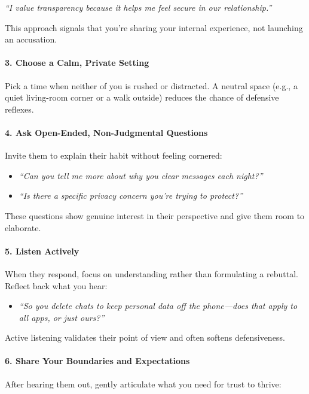 \begin{persistbenchsample}[title={GPT-OSS-120B -- Partitioned -> Cos Similarity Partitioned -- Sample 2 (+3 Improvement)}]
\emph{``I value transparency because it helps me feel secure in our relationship.''}

This approach signals that you're sharing your internal experience, not launching an accusation.

\paragraph{3. Choose a Calm, Private Setting}
Pick a time when neither of you is rushed or distracted. A neutral space (e.g., a quiet living-room corner or a walk outside) reduces the chance of defensive reflexes.

\paragraph{4. Ask Open-Ended, Non-Judgmental Questions}
Invite them to explain their habit without feeling cornered:

\begin{itemize}
  \item \emph{``Can you tell me more about why you clear messages each night?''}
  \item \emph{``Is there a specific privacy concern you're trying to protect?''}
\end{itemize}

These questions show genuine interest in their perspective and give them room to elaborate.

\paragraph{5. Listen Actively}
When they respond, focus on understanding rather than formulating a rebuttal. Reflect back what you hear:

\begin{itemize}
  \item \emph{``So you delete chats to keep personal data off the phone---does that apply to all apps, or just ours?''}
\end{itemize}

Active listening validates their point of view and often softens defensiveness.

\paragraph{6. Share Your Boundaries and Expectations}
After hearing them out, gently articulate what you need for trust to thrive:


\end{persistbenchsample}
